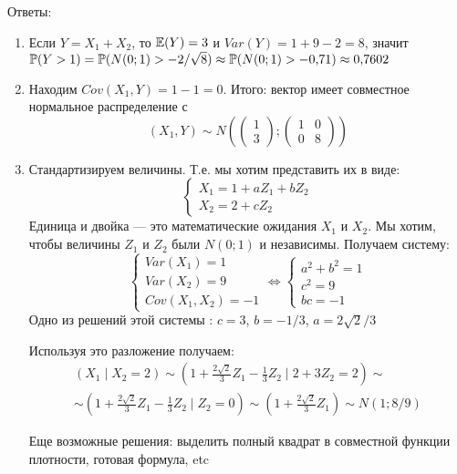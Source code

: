 \documentclass[pdftex,12pt,a4paper]{article}
\begin{document}
\begin{enumerate}
Ответы:
\begin{enumerate}
\item Если $Y=X_1+X_2$, то $\E(Y)=3$ и $Var(Y)=1+9-2=8$, значит $\P(Y>1)=\P(N(0;1)>-2/\sqrt{8})\approx \P(N(0;1)>-0{,}71)\approx 0{,}7602$
\item Находим $Cov(X_1,Y)=1-1=0$. Итого: вектор имеет совместное нормальное распределение с
\begin{equation}
(X_1,Y)\sim N\left(
\left(\begin{array}{l} 
{1} \\ 
{3}
\end{array}\right);
\left(\begin{array}{cc} 
{1} & {0} \\ 
{0} & {8} 
\end{array}\right)
\right)
\end{equation}
\item Стандартизируем величины. Т.е. мы хотим представить их в виде:
\begin{equation}
\begin{cases}
X_1=1+aZ_1+bZ_2 \\
X_2=2+cZ_2
\end{cases}
\end{equation}
Единица и двойка --- это математические ожидания $X_1$ и $X_2$. Мы хотим, чтобы величины $Z_1$ и $Z_2$ были $N(0;1)$ и независимы.
Получаем систему:
\begin{equation}
\begin{cases}
Var(X_1)=1 \\
Var(X_2)=9 \\
Cov(X_1,X_2)=-1 
\end{cases} \Leftrightarrow
\begin{cases}
a^2+b^2=1 \\
c^2=9 \\
bc=-1 
\end{cases}
\end{equation}
Одно из решений этой системы : $c=3$, $b=-1/3$, $a=2\sqrt{2}/3$

Используя это разложение получаем:
\begin{multline}
\left( X_1 \mid X_2=2\right) \sim \left( 1+\frac{2\sqrt{2}}{3}Z_1-\frac{1}{3}Z_2\mid 2+ 3Z_2=2\right)\sim \\
\sim\left(1+\frac{2\sqrt{2}}{3}Z_1-\frac{1}{3}Z_2\mid Z_2=0\right)\sim \left(1+\frac{2\sqrt{2}}{3}Z_1\right)\sim N(1;8/9)
\end{multline}

Еще возможные решения: выделить полный квадрат в совместной функции плотности, готовая формула, etc


\end{enumerate}
\end{enumerate}
\end{document}
